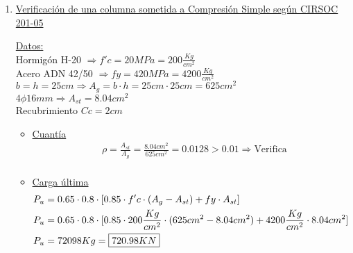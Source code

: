 \begin{enumerate}
\item \underline{Verificación de una columna sometida a Compresión Simple según CIRSOC 201-05}

\underline{Datos:}\\
Hormigón H-20 $\Rightarrow f'c = 20 MPa = 200 \frac{Kg}{cm^2}$\\
Acero ADN 42/50 $\Rightarrow fy = 420 MPa = 4200 \frac{Kg}{cm^2}$\\
$b = h = 25cm \Rightarrow A_g = b \cdot h = 25cm \cdot 25cm = 625cm^2$\\
$4 \phi 16mm \Rightarrow A_{st} = 8.04cm^2$\\
Recubrimiento $Cc = 2cm$\\

\begin{itemize}
\item \underline{Cuantía}
\begin{align*}
& \rho = \frac{A_{st}}{A_g} = \frac{8.04cm^2}{625cm^2} = 0.0128 > 0.01 \Rightarrow \text{Verifica} \\
\end{align*}

\item \underline{Carga última}
\begin{align*}
& P_u = 0.65 \cdot 0.8 \cdot [0.85 \cdot f'c \cdot (A_g - A_{st}) + fy \cdot A_{st}] \\
& P_u = 0.65 \cdot 0.8 \cdot [0.85 \cdot 200 \frac{Kg}{cm^2} \cdot (625cm^2 - 8.04cm^2) + 4200 \frac{Kg}{cm^2} \cdot 8.04cm^2] \\
& P_u = 72098Kg = \framebox{$720.98KN$}
\end{align*}

\end{itemize}
\end{enumerate}